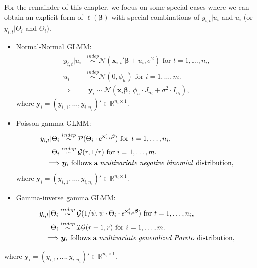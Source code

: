 \documentclass[ignorenonframetext,]{beamer}
\begin{document}
\begin{frame}[allowframebreaks]
\framebreak

For the remainder of this chapter, we focus on some special cases where we can obtain an explicit form of $\ell(\bm{\beta})$ with special combinations of $y_{i,t}|u_i$ and $u_i$ (or $y_{i,t}|\Theta_i$ and $\Theta_i$).
\begin{itemize}
	\item Normal-Normal GLMM:
	\begin{align*}
	y_{i,t}|u_i &\overset{indep}\sim \mathcal{N}(\mathbf{x}_{i,t}'\bm{\beta} + u_i, \sigma^2) \text{ for } t=1,\ldots, n_i, \\
	u_i &\overset{indep}\sim \mathcal{N}(0, \phi_u) \text{ for } i=1,\ldots, m. \\
	\Longrightarrow & \ \bm{y}_i \sim \mathcal{N}\left( \mathbf{x}_i \bm{\beta}, \, \phi_u \cdot J_{n_i} + \sigma^2 \cdot I_{n_i} \right),
	\end{align*}
	where $\bm{y}_i = (y_{i,1}, \ldots, y_{i,n_i})' \in \mathbb{R}^{n_i \times 1}$.
\end{itemize}

\framebreak

\begin{itemize}
	\item Poisson-gamma GLMM:
	\begin{align*}
	y_{i,t}|\Theta_i &\overset{indep}\sim \mathcal{P}(\Theta_i \cdot e^{\mathbf{x}_{i,t}'\bm{\beta}}) \text{ for } t=1,\ldots, n_i, \\
	\Theta_i &\overset{indep}\sim \mathcal{G}(r, 1/r) \text{ for } i=1,\ldots, m. \\
	\Longrightarrow & \ \bm{y}_i \text{ follows a \emph{multivariate negative binomial} distribution,}
	\end{align*}
	where $\bm{y}_i = (y_{i,1}, \ldots, y_{i,n_i})' \in \mathbb{R}^{n_i \times 1}$.
\end{itemize}

\framebreak

\begin{itemize}
	\item Gamma-inverse gamma GLMM:
	\begin{align*}
	y_{i,t}|\Theta_i &\overset{indep}\sim \mathcal{G}(1/\psi, \psi \cdot \Theta_i \cdot e^{\mathbf{x}_{i,t}'\bm{\beta}}) \text{ for } t=1,\ldots, n_i, \\
	\Theta_i &\overset{indep}\sim \mathcal{IG}(r+1, r) \text{ for } i=1,\ldots, m. \\
	\Longrightarrow & \ \bm{y}_i \text{ follows a \emph{multivariate generalized Pareto} distribution,}
	\end{align*}
\end{itemize}
where $\bm{y}_i = (y_{i,1}, \ldots, y_{i,n_i})' \in \mathbb{R}^{n_i \times 1}$.

\end{frame}
\end{document}
